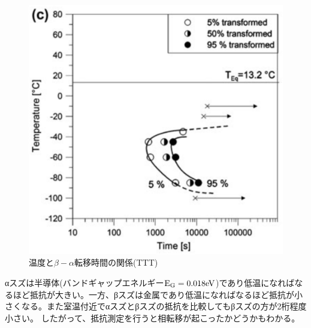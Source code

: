 \begin{figure}[!h]
    \begin{center}
   \includegraphics[width=130mm]{Introduction/TTT.eps}
  \end{center}
  \caption{温度と$\beta-\alpha$転移時間の関係(TTT)\cite{Nogita}}
  \label{fig:TTT}
\end{figure}

αスズは半導体(バンドギャップエネルギー$\rm E_G=0.018eV$)であり低温になればなるほど抵抗が大きい。一方、βスズは金属であり低温になればなるほど抵抗が小さくなる。また室温付近でαスズとβスズの抵抗を比較してもβスズの方が2桁程度小さい。\cite{} したがって、抵抗測定を行うと相転移が起こったかどうかもわかる。



